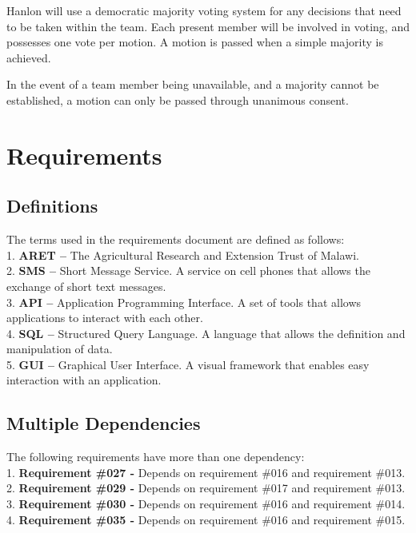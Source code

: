 \documentclass[12pt,letterpaper]{article}
\begin{document}
Hanlon will use a democratic majority voting system for any decisions that need to be taken within the team. Each present member will be involved in voting, and possesses one vote per motion. A motion is passed when a simple majority is achieved. \par

In the event of a team member being unavailable, and a majority cannot be established, a motion can only be passed through unanimous consent.

\clearpage
\section{Requirements}
\subsection{Definitions}
The terms used in the requirements document are defined as follows:\\
1. \hspace*{5pt} \textbf{ARET -- } The Agricultural Research and Extension Trust of Malawi. \\
2. \hspace*{5pt} \textbf{SMS -- } Short Message Service. A service on cell phones that allows the exchange of short text messages.\\
3. \hspace*{5pt} \textbf{API -- } Application Programming Interface. A set of tools that allows applications to interact with each other.\\
4. \hspace*{5pt} \textbf{SQL -- } Structured Query Language. A language that allows the definition and manipulation of data.\\
5. \hspace*{5pt} \textbf{GUI -- } Graphical User Interface. A visual framework that enables easy interaction with an application.

\subsection{Multiple Dependencies}
The following requirements have more than one dependency: \\
1. \textbf{Requirement \#027 -} Depends on requirement \#016 and requirement \#013. \\
2. \textbf{Requirement \#029 -} Depends on requirement \#017 and requirement \#013. \\
3. \textbf{Requirement \#030 -} Depends on requirement \#016 and requirement \#014. \\
4. \textbf{Requirement \#035 -} Depends on requirement \#016 and requirement \#015.
\end{document}
